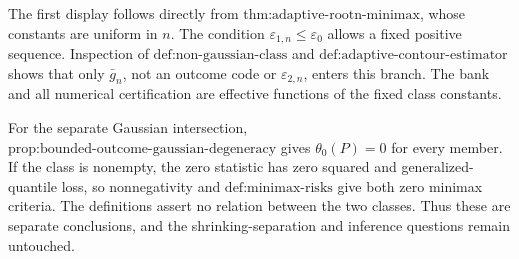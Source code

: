 The first display follows directly from \(\text{thm:adaptive-rootn-minimax}\), whose constants are uniform in \(n\).  The condition \(\varepsilon_{1,n}\le\varepsilon_0\) allows a fixed positive sequence.  Inspection of \(\text{def:non-gaussian-class}\) and \(\text{def:adaptive-contour-estimator}\) shows that only \(\bar g_n\), not an outcome code or \(\varepsilon_{2,n}\), enters this branch.  The bank and all numerical certification are effective functions of the fixed class constants.

For the separate Gaussian intersection, \(\text{prop:bounded-outcome-gaussian-degeneracy}\) gives \(\theta_0(P)=0\) for every member.  If the class is nonempty, the zero statistic has zero squared and generalized-quantile loss, so nonnegativity and \(\text{def:minimax-risks}\) give both zero minimax criteria.  The definitions assert no relation between the two classes.  Thus these are separate conclusions, and the shrinking-separation and inference questions remain untouched.